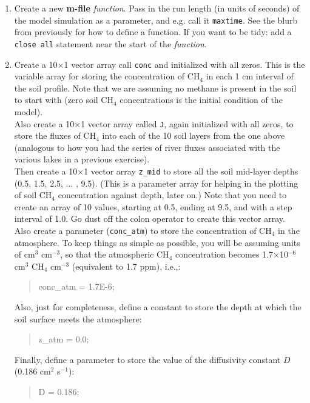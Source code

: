 \documentclass{tufte-book} %
\newenvironment{docspec}{\begin{quotation}\ttfamily\parskip0pt\parindent0pt\ignorespaces}{\end{quotation}}
\begin{document}
\begin{enumerate}
\setlength{\itemindent}{.2in}

\item 
Create a new \textbf{m-file} \textit{function}.  Pass in the   run length (in units of seconds) of the model simulation as a parameter, and e.g. call it \texttt{maxtime}. See the  blurb from previously  for how to define a function. If you want to be tidy: add a \texttt{close all} statement near the start of the \textit{function}.

\item
Create a 10\(\times\)1 vector array call \texttt{conc} and initialized with all zeros. This is the variable array for storing the concentration of CH\(_4\) in each 1 cm interval of the soil profile. Note that we are assuming no methane is present in the soil to start with (zero soil CH\(_{4}\) concentrations is the initial condition of the model).
\\Also create a 10\(\times\)1 vector array called \texttt{J}, again initialized with all zeros, to store the fluxes of CH\(_{4}\) into each of the 10 soil layers from the one above (analogous to how you had the series of river fluxes associated with the various lakes in a previous exercise).
\\Then create a 10\(\times\)1 vector array \texttt{z\_mid} to store all the soil mid-layer depths (0.5, 1.5, 2.5, ... , 9.5). (This is a parameter array for helping in the plotting of soil CH\(_{4}\) concentration against depth, later on.) Note that you need to create an array of 10 values, starting at 0.5, ending at 9.5, and with a step interval of 1.0. Go dust off the colon operator to create this vector array.
\\Also create a parameter (\texttt{conc\_atm}) to store the concentration of CH\(_{4}\) in the atmosphere. To keep things as simple as possible, you will be assuming units of cm\(^{3}\) cm\(^{-3}\), so that the atmospheric CH\(_{4}\) concentration becomes 1.7\(\times\)10\(^{-6}\) cm\(^{3}\) CH\(_{4}\) cm\(^{-3}\) (equivalent to 1.7 ppm), i.e.,:
\begin{docspec}
conc\_atm = 1.7E-6;
\end{docspec}
Also, just for completeness, define a constant to store the depth at which the soil surface meets the atmosphere:
\begin{docspec}
z\_atm = 0.0;
\end{docspec}
Finally, define a parameter to store the value of the diffusivity constant \(D\) (0.186 cm\(^{2}\) s\(^{-1}\)):
\begin{docspec}
D = 0.186;
\end{docspec}


\end{enumerate}
\end{document}
